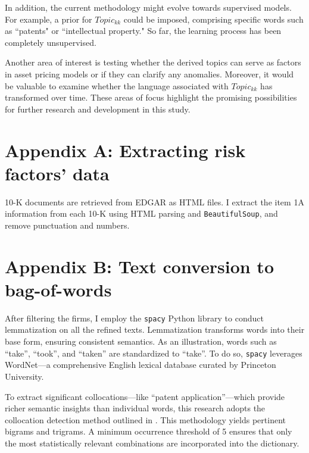 \documentclass[12pt, letterpaper]{article}
\begin{document}
In addition, the current methodology might evolve towards supervised models. For example, a prior for $Topic_{kk}$ could be imposed, comprising specific words such as ``patents" or ``intellectual property." So far, the learning process has been completely unsupervised.

Another area of interest is testing whether the derived topics can serve as factors in asset pricing models or if they can clarify any anomalies. Moreover, it would be valuable to examine whether the language associated with $Topic_{kk}$ has transformed over time. These areas of focus highlight the promising possibilities for further research and development in this study.

%
%
%
%
%



\section*{Appendix A: Extracting risk factors' data}
10-K documents are retrieved from EDGAR as HTML files.
I extract the item 1A information from each 10-K using HTML parsing and \texttt{BeautifulSoup}, and remove punctuation and numbers.

\section*{Appendix B: Text conversion to bag-of-words}
\label{bow}

After filtering the firms, I employ the \texttt{spacy} Python library to conduct lemmatization on all the refined texts. Lemmatization transforms words into their base form, ensuring consistent semantics. As an illustration, words such as ``take'', ``took'', and ``taken'' are standardized to ``take''. To do so, \texttt{spacy} leverages WordNet---a comprehensive English lexical database curated by Princeton University.

To extract significant collocations---like ``patent application''---which provide richer semantic insights than individual words, this research adopts the collocation detection method outlined in \cite{Mikolov2013-be}. This methodology yields pertinent bigrams and trigrams. A minimum occurrence threshold of 5 ensures that only the most statistically relevant combinations are incorporated into the dictionary.
\end{document}
